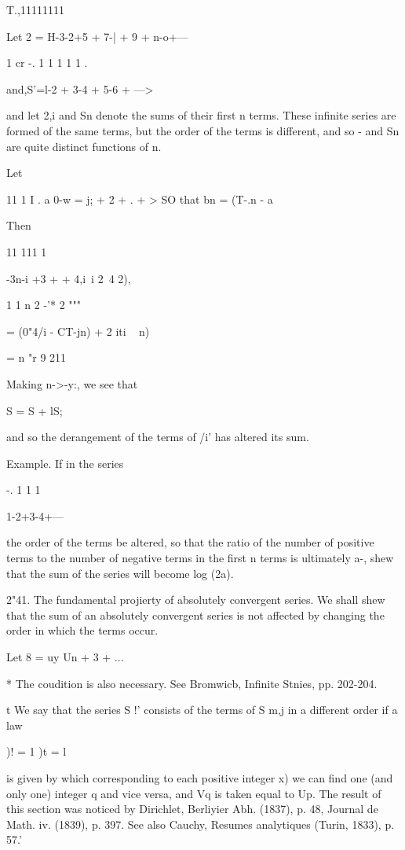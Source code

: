 T.,11111111

Let 2 = H-3-2+5 + 7-| + 9 + n-o+---

1 cr -. 1 1 1 1 1 .

and,S'=l-2 + 3-4 + 5-6 + --->

and let 2,i and Sn denote the sums of their first n terms. These
infinite series are formed of the same terms, but the order of the
terms is different, and so - and Sn are quite distinct functions of n.

Let

11 1 I . a 0-w = j; + 2 +   . + > SO that bn = (T-.n - a

Then

 11 111 1

-3n-i +3 +  + 4,i\ i 2~4  2),

1 1 n 2 -'* 2 """

= (0"4/i - CT-jn) + 2 iti ~ n)

= n "r 9 211 

Making n->-y:, we see that

S = S + lS;

and so the derangement of the terms of /i' has altered its sum.

Example. If in the series

-. 1 1 1

1-2+3-4+---

the order of the terms be altered, so that the ratio of the number of
positive terms to the number of negative terms in the first n terms is
ultimately a-, shew that the sum of the series will become log (2a).

2"41. The fundamental projierty of absolutely convergent series. We
shall shew that the sum of an absolutely convergent series is not
affected by changing the order in which the terms occur.

Let 8 = uy Un + 3 + ...

* The coudition is also necessary. See Bromwicb, Infinite Stnies, pp.
202-204.

t We say that the series S !' consists of the terms of S m,j in a
different order if a law

)! = 1 )t = l

is given by which corresponding to each positive integer x) we can
find one (and only one) integer q and vice versa, and Vq is taken
equal to Up. The result of this section was noticed by Dirichlet,
Berliyier Abh. (1837), p. 48, Journal de Math. iv. (1839), p. 397. See
also Cauchy, Resumes analytiques (Turin, 1833), p. 57.'

